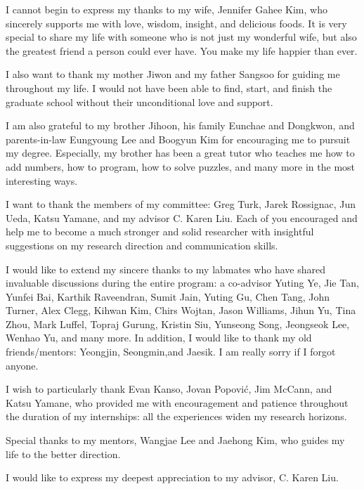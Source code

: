 I cannot begin to express my thanks to my wife, Jennifer Gahee Kim,
who sincerely supports me with love, wisdom, insight, and delicious foods.
It is very special to share my life with someone who is not just my wonderful
wife, but also the greatest friend a person could ever have.
You make my life happier than ever.

I also want to thank my mother Jiwon and my father Sangsoo for guiding me
throughout my life.
I would not have been able to find, start, and finish the graduate school without
their unconditional love and support.

I am also grateful to my brother Jihoon, his family Eunchae and Dongkwon,
and parents-in-law Eungyoung Lee and Boogyun Kim for encouraging me to pursuit
my degree.
Especially, my brother has been a great tutor who teaches me
how to add numbers, how to program, how to solve puzzles, and many more
in the most interesting ways.

I want to thank the members of my committee: Greg Turk, Jarek Rossignac,
Jun Ueda, Katsu Yamane, and my advisor C. Karen Liu.
Each of you encouraged and help me to become a much stronger and solid
researcher with insightful suggestions on my research direction and
communication skills.

I would like to extend my sincere thanks to my labmates
who have shared invaluable discussions during the entire program:
a co-advisor Yuting Ye, Jie Tan, Yunfei Bai, Karthik Raveendran, 
Sumit Jain, Yuting Gu, Chen Tang, John Turner, Alex Clegg, Kihwan Kim, 
Chirs Wojtan, Jason Williams, Jihun Yu, Tina Zhou, Mark Luffel, 
Topraj Gurung, Kristin Siu, Yunseong Song,
Jeongseok Lee, Wenhao Yu, and many more.
In addition, I would like to thank my old friends/mentors: Yeongjin, Seongmin,and Jaesik.
I am really sorry if I forgot anyone.

I wish to particularly thank Evan Kanso, Jovan Popovi\'{c}, Jim McCann, and
Katsu Yamane, who provided me with encouragement and patience throughout the
duration of my internships: all the experiences widen my research horizons.

Special thanks to my mentors, Wangjae Lee and Jaehong Kim, who
guides my life to the better direction.

I would like to express my deepest appreciation to my advisor, C. Karen Liu.












